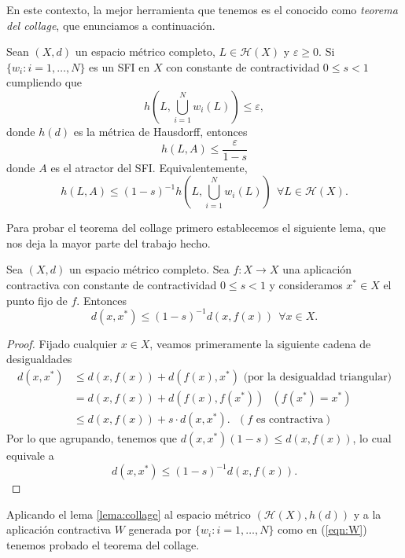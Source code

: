 En este contexto, la mejor herramienta que tenemos es el conocido como \textit{teorema del collage}, que enunciamos a continuación.

\begin{teorema}
    Sean $(X,d)$ un espacio métrico completo, $L\in\mathcal{H}(X)$ y $\varepsilon\geq 0$. Si $\{w_i:i=1,\dots,N\}$ es un SFI en $X$ con constante de contractividad $0\leq s < 1$ cumpliendo que
    $$
    h\left(L,\bigcup_{i=1}^N w_i(L)\right) \leq \varepsilon,
    $$
    donde $h(d)$ es la métrica de Hausdorff, entonces
    $$
    h(L,A)\leq \dfrac{\varepsilon}{1-s}
    $$
    donde $A$ es el atractor del SFI. Equivalentemente,
    $$
    h(L,A)\leq(1-s)^{-1} h\left(L, \bigcup_{i=1}^N w_i(L)\right) \ \ \forall L\in\mathcal{H}(X).
    $$
\end{teorema}

Para probar el teorema del collage primero establecemos el siguiente lema, que nos deja la mayor parte del trabajo hecho.

\begin{lema}
    Sea $(X,d)$ un espacio métrico completo. Sea $f:X\longrightarrow X$ una aplicación contractiva con constante de contractividad $0\leq s < 1$ y consideramos $x^*\in X$ el punto fijo de $f$. Entonces
    $$
    d(x,x^*)\leq (1-s)^{-1} d(x,f(x)) \ \ \forall x\in X.
    $$
    \label{lema:collage}
\end{lema}
\begin{proof}
    Fijado cualquier $x\in X$, veamos primeramente la siguiente cadena de desigualdades
    \begin{equation*}
        \begin{split}
            d(x,x^*) & \leq d(x,f(x)) + d(f(x),x^*) \text{ (por la desigualdad triangular)} \\
            & = d(x,f(x)) + d(f(x),f(x^*)) \ \ \ (f(x^*)=x^*) \\
            & \leq d(x,f(x)) + s \cdot d(x,x^*). \ \ \ (f \text{ es contractiva})
        \end{split}
    \end{equation*}
    Por lo que agrupando, tenemos que $d(x,x^*)(1-s)\leq d(x,f(x))$, lo cual equivale a
    $$
    d(x,x^*)\leq (1-s)^{-1} d(x,f(x)).
    $$
\end{proof}

Aplicando el lema \ref{lema:collage} al espacio métrico $(\mathcal{H}(X), h(d))$ y a la aplicación contractiva $W$ generada por $\{w_i:i=1,\dots,N\}$ como en (\ref{eqn:W}) tenemos probado el teorema del collage.

